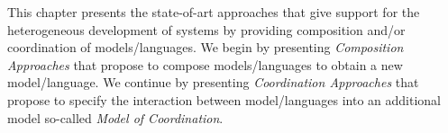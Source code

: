 This chapter presents the state-of-art approaches that give support for the heterogeneous development of systems by providing composition and/or coordination of models/languages. We begin by presenting \emph{Composition Approaches} that propose to compose models/languages to obtain a new model/language. We continue by presenting \emph{Coordination Approaches} that propose to specify the interaction between model/languages into an additional model so-called \emph{Model of Coordination}.   



 
